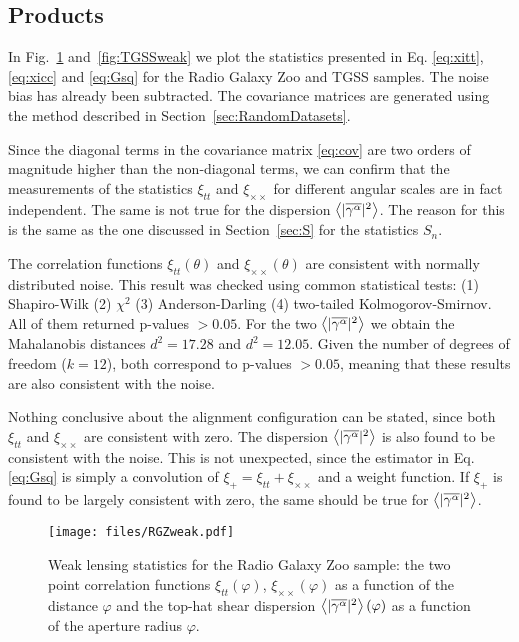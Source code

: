 		
		\subsection{Products}
		
		In Fig.~\ref{fig:RGZweak} and~\ref{fig:TGSSweak} we plot the statistics presented in Eq. \eqref{eq:xitt}, \eqref{eq:xicc} and \eqref{eq:Gsq} for the Radio Galaxy Zoo and TGSS samples. The noise bias has already been subtracted. The covariance matrices are generated using the method described in Section~\ref{sec:RandomDatasets}.
		
		Since the diagonal terms in the covariance matrix \eqref{eq:cov} are two orders of magnitude higher than the non-diagonal terms, we can confirm that the measurements of the statistics $\xi_{tt}$ and $\xi_{\times \times}$ for different angular scales are in fact independent. The same is not true for the dispersion $\left\langle |\overline{\gamma^\alpha}|^2 \right\rangle$. The reason for this is the same as the one discussed in Section~\ref{sec:S} for the statistics $S_n$. 	
		
		
		The correlation functions $\xi_{tt}(\theta)$ and $\xi_{\times \times}(\theta)$ are consistent with normally distributed noise. This result was checked using common statistical tests: (1) Shapiro-Wilk (2) $\chi^2$ (3) Anderson-Darling (4) two-tailed Kolmogorov-Smirnov. All of them returned p-values $> 0.05$. For the two $\left\langle |\overline{\gamma^\alpha}|^2 \right\rangle$ we obtain the Mahalanobis distances $d^2 = 17.28$ and $d^2 = 12.05$. Given the number of degrees of freedom ($k=12$), both correspond to p-values $>0.05$, meaning that these results are also consistent with the noise. 
		
		Nothing conclusive about the alignment configuration can be stated, since both $\xi_{tt}$ and $\xi_{\times \times}$ are consistent with zero. The dispersion $\left\langle |\overline{\gamma^\alpha}|^2 \right\rangle$ is also found to be consistent with the noise. This is not unexpected, since the estimator in Eq. \eqref{eq:Gsq} is simply a convolution of $\xi_{+} = \xi_{tt} + \xi_{\times \times}$ and a weight function. If $\xi_{+}$ is found to be largely consistent with zero, the same should be true for $\left\langle |\overline{\gamma^\alpha}|^2 \right\rangle$.
		
		
		\begin{figure}
			\texttt{[image: files/RGZweak.pdf]}
			\caption{Weak lensing statistics for the Radio Galaxy Zoo sample: the two point correlation functions $\xi_{tt}(\varphi)$, $\xi_{\times \times}(\varphi)$ as a function of the distance $\varphi$ and the top-hat shear dispersion $\left\langle |\overline{\gamma^\alpha}|^2 \right\rangle(\varphi)$ as a function of the aperture radius $\varphi$.}
			
			\label{fig:RGZweak}
		\end{figure}
		
